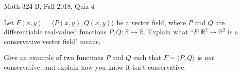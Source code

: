 \documentclass{exam}
\begin{document}
 
\begin{center} \begin{Large} Math 324 B, Fall 2018, Quiz 4\end{Large}
\end{center} 

\vspace{5mm}

\begin{center}
\end{center}

\vspace{1cm}
 

\vspace{1cm}

\begin{questions}
\question Let $F(x,y) = \langle P(x,y), Q(x,y) \rangle$ be a vector field, where $P$ and $Q$ are differentiable real-valued functions $P,Q: \mathbb{R} \to \mathbb{R}$. Explain what ``$F: \mathbb{R}^2 \to \mathbb{R}^2$ is a conservative vector field" means.

\vfill 

\question Give an example of two functions $P$ and $Q$ such that $F = \langle P, Q \rangle$ is \emph{not} conservative, and explain how you know it isn't conservative. 

\vfill


\end{questions}
\end{document}
